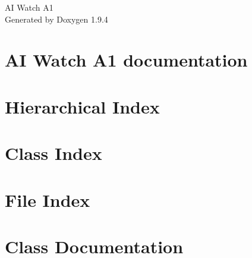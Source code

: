 \documentclass[twoside]{book}
\newcommand{\+}{\discretionary{\mbox{\scriptsize$\hookleftarrow$}}{}{}}
\newcommand{\clearemptydoublepage}{%
    \newpage{\pagestyle{empty}\cleardoublepage}%
  }
\begin{document}
  \raggedbottom
    \hypersetup{pageanchor=false,
                bookmarksnumbered=true,
                pdfencoding=unicode
               }
  \begin{titlepage}
  \vspace*{7cm}
  \begin{center}%
  {\Large AI Watch A1}\\
  \vspace*{1cm}
  {\large Generated by Doxygen 1.9.4}\\
  \end{center}
  \end{titlepage}
  \clearemptydoublepage
  \tableofcontents
  \clearemptydoublepage
  \hypersetup{pageanchor=true}
\chapter{AI Watch A1 documentation}
\label{index}\hypertarget{index}{}
\chapter{Hierarchical Index}

\chapter{Class Index}

\chapter{File Index}

\chapter{Class Documentation}





















\end{document}
